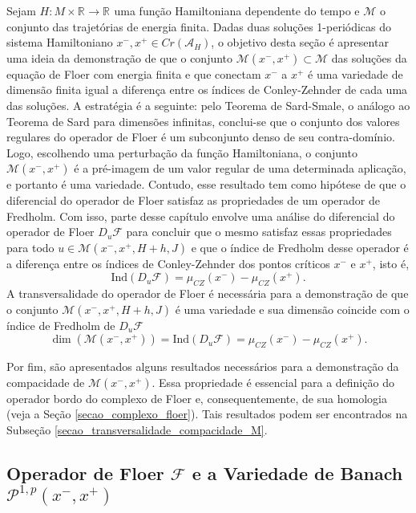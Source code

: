 \documentclass[12pt]{book}
\newcommand{\caminhosexponenciaisconectantes}[2]{\mathcal{P}^{1,p}(#1, #2)}
\newcommand{\caminhosexponenciaisconectantespadrao}{\caminhosexponenciaisconectantes{x^{-}}{x^{+}}}
\newcommand{\diferencialfloerponto}[1]{D_{#1}\operadorFloer}
\newcommand{\energiafinitaM}{\mathcal{M}}
\newcommand{\energiafinitaMconectante}{\energiafinitaM(x^{-}, x^{+})}
\newcommand{\energiafinitaMconectanteHamiltoniana}{\energiafinitaM(x^{-}, x^{+},H+h,J)}
\newcommand{\funcionalH}{\mathcal{A}_{H}}
\newcommand{\iconley}[1]{\iconleyabrev(#1)}
\newcommand{\iconleyabrev}{\mu_{CZ}}
\newcommand{\ind}{\text{Ind}}
\newcommand{\operadorFloer}{\mathcal{F}}
\newcommand{\pontoscriticos}[1]{\textit{Cr}(#1)}
\newcommand{\real}[1]{\mathbb{R}^{#1}}
\newcommand{\reta}{\real{}}
\begin{document}
	Sejam $H:M\times \reta\to \reta$ uma função Hamiltoniana dependente do tempo e $\energiafinitaM$ o conjunto das trajetórias de energia finita. Dadas duas soluções 1-periódicas do sistema Hamiltoniano $x^{-}, x^{+} \in \pontoscriticos{\funcionalH}$, o objetivo desta seção é apresentar uma ideia da demonstração de que o conjunto $\energiafinitaMconectante \subset \energiafinitaM$ das soluções da equação de Floer com energia finita e que conectam $x^{-}$ a $x^{+}$ é uma variedade de dimensão finita igual a diferença entre os índices de Conley-Zehnder de cada uma das soluções. A estratégia é a seguinte: pelo Teorema de Sard-Smale, o análogo ao Teorema de Sard para dimensões infinitas, conclui-se que o conjunto dos valores regulares do operador de Floer é um subconjunto denso de seu contra-domínio. Logo, escolhendo uma perturbação da função Hamiltoniana, o conjunto $\energiafinitaMconectante$ é a pré-imagem de um valor regular de uma determinada aplicação, e portanto é uma variedade. Contudo, esse resultado tem como hipótese de que o diferencial do operador de Floer satisfaz as propriedades de um operador de Fredholm. Com isso, parte desse capítulo envolve uma análise do diferencial do operador de Floer $\diferencialfloerponto{u}$ para concluir que o mesmo satisfaz essas propriedades para todo $u\in \energiafinitaMconectanteHamiltoniana$ e que o índice de Fredholm desse operador é a diferença entre os índices de Conley-Zehnder dos pontos críticos $x^{-}$ e $x^{+}$, isto é, 
	$$
	\ind(\diferencialfloerponto{u})=\iconley{x^{-}}-\iconley{x^{+}}.
	$$
	A transversalidade do operador de Floer é necessária para a demonstração de que o conjunto  $\energiafinitaMconectanteHamiltoniana$ é uma variedade e sua dimensão coincide com o índice de Fredholm de $\diferencialfloerponto{u}$
	$$
	\dim(\energiafinitaMconectante)= \ind(\diferencialfloerponto{u}) = \iconley{x^{-}}-\iconley{x^{+}}.
	$$
	
	Por fim, são apresentados alguns resultados necessários para a demonstração da compacidade de $\energiafinitaMconectante$. Essa propriedade é essencial para a definição do operador bordo do complexo de Floer e, consequentemente, de sua homologia (veja a Seção \ref{secao_complexo_floer}). Tais resultados podem ser encontrados na Subseção \ref{secao_transversalidade_compacidade_M}.
	
	\subsection{Operador de Floer $\operadorFloer$ e a Variedade de Banach $\caminhosexponenciaisconectantespadrao$}\label{secao_variedade_banach_P}
	
\end{document}
